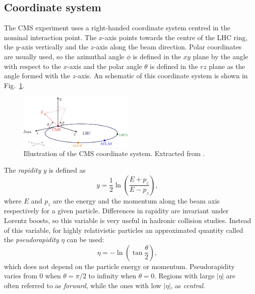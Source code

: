 \documentclass[../main.tex]{subfiles}
\begin{document}
\subsection{Coordinate system}

The CMS experiment uses a right-handed coordinate system centred in the nominal interaction point. The $x$-axis points towards the centre of the LHC ring, the $y$-axis vertically and the $z$-axis along the beam direction. Polar coordinates are usually used, so the azimuthal angle $\phi$ is defined in the $xy$ plane by the angle with respect to the $x$-axis and the polar angle $\theta$ is defined in the $rz$ plane as the angle formed with the $z$-axis. An schematic of this coordinate system is shown in Fig.~\ref{intro:exp:cms_coords}.

\begin{figure}[h!]
\begin{center}
\includegraphics[width=0.5\textwidth]{Images/axis3D_CMS-002}
\end{center}
\caption{Illustration of the CMS coordinate system. Extracted from \cite{intro:exp:cms_coord}.}
\label{intro:exp:cms_coords}
\end{figure}

The \textit{rapidity} $y$ is defined as
\begin{equation}
y = \frac{1}{2}\ln\left(\frac{E+p_z}{E-p_z}\right),
\end{equation}
where $E$ and $p_z$ are the energy and the momentum along the beam axis respectively for a given particle. Differences in rapidity are invariant under Lorentz boosts, so this variable is very useful in hadronic collision studies. Instead of this variable, for highly relativistic particles an approximated quantity called the \textit{pseudorapidity} $\eta$ can be used:
\begin{equation}
\eta = -\ln\left(\tan \frac{\theta}{2} \right),
\end{equation}
which does not depend on the particle energy or momentum. Pseudorapidity varies from 0 when $\theta=\pi/2$ to infinity when $\theta=0$. Regions with large $|\eta|$ are often referred to as \textit{forward}, while the ones with low $|\eta|$, as \textit{central}.
\end{document}
